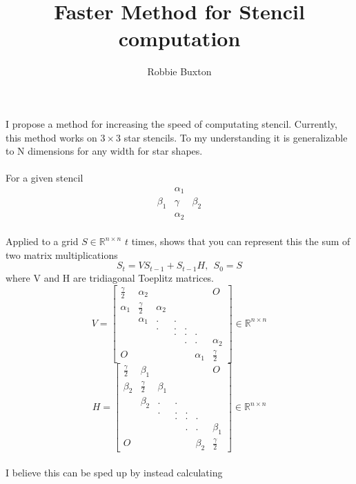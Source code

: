 \documentclass{article}
\begin{document}
\title{Faster Method for Stencil computation}
\author{Robbie Buxton}
\maketitle
I propose a method for increasing the speed of computating stencil. 
Currently, this method works on $3\times 3$ star stencils. To my understanding it is generalizable to N dimensions for any width for star shapes. \\ \\
For a given stencil
\newcommand{\stencilTop}{\alpha_{1}}
\newcommand{\stencilLeft}{\beta_{1}}
\newcommand{\stencilMiddle}{\gamma}
\newcommand{\stencilRight}{\beta_{2}}
\newcommand{\stencilBottom}{\alpha_{2}}
\[\begin{matrix} 
	& \stencilTop  & \\
	\stencilLeft  & \stencilMiddle  & \stencilRight  \\
	& \stencilBottom & 
\end{matrix}\] \\
\newcommand{\verticalBands}{V}
\newcommand{\horizontalBands}{H}
\newcommand{\sourceGrid}{S}
Applied to a grid $\sourceGrid \in \mathbb{R}^{n \times n}$ $t$ times,
\cite{10.1145/3524059.3532392} shows that you can represent this the sum of two matrix multiplications
\[ \sourceGrid_t = \verticalBands \sourceGrid_{t-1} + \sourceGrid_{t-1} \horizontalBands, \> \> S_0 = S\]
where V and H are tridiagonal Toeplitz matrices. 
\[ \verticalBands = 
\begin{bmatrix}
	\frac{\stencilMiddle}{2} & \stencilBottom & & & & & O \\ 
	\stencilTop & \frac{\stencilMiddle}{2} & \stencilBottom & & & & \\
	& \stencilTop & . & . & & & \\
	& &  . & . & . & &  \\
	& & & . & . & . & \\
	& & & & . & .& \stencilBottom \\
	O & & & & &  \stencilTop & \frac{\stencilMiddle}{2}
\end{bmatrix} \in \mathbb{R}^{n\times n} \]
\[\horizontalBands = 
\begin{bmatrix}
	\frac{\stencilMiddle}{2} & \stencilLeft & & & & & O \\ 
	\stencilRight & \frac{\stencilMiddle}{2} & \stencilLeft & & & & \\
	& \stencilRight & . & . & & & \\
	& &  . & . & . & &  \\
	& & & . & . & . & \\
	& & & & . & .& \stencilLeft \\
	O & & & & &  \stencilRight & \frac{\stencilMiddle}{2}
\end{bmatrix} \in \mathbb{R}^{n\times n}\] \\ 
I believe this can be sped up by instead calculating
\newcommand{\innerSum}{C}
\newcommand{\verticalBasis}{{X_V}}
\newcommand{\verticalEigens}{{\Lambda_V}}
\newcommand{\horizontalBasis}{{X_H}}
\newcommand{\horizontalEigens}{{\Lambda_H}}
\newcommand{\transformedSourceGrid}{T}
\end{document}
